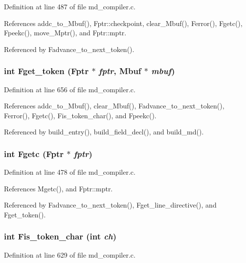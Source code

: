 Definition at line 487 of file md\_\-compiler.c.

References addc\_\-to\_\-Mbuf(), Fptr::checkpoint, clear\_\-Mbuf(), Ferror(), Fgetc(), Fpeekc(), move\_\-Mptr(), and Fptr::mptr.

Referenced by Fadvance\_\-to\_\-next\_\-token().
\subsubsection{\setlength{\rightskip}{0pt plus 5cm}int Fget\_\-token (\bf{Fptr} $\ast$ {\em fptr}, \bf{Mbuf} $\ast$ {\em mbuf})}\label{md__compiler_8c_eb1a56e9e7d7b8a58203813ef35c7452}




Definition at line 656 of file md\_\-compiler.c.

References addc\_\-to\_\-Mbuf(), clear\_\-Mbuf(), Fadvance\_\-to\_\-next\_\-token(), Ferror(), Fgetc(), Fis\_\-token\_\-char(), and Fpeekc().

Referenced by build\_\-entry(), build\_\-field\_\-decl(), and build\_\-md().
\subsubsection{\setlength{\rightskip}{0pt plus 5cm}int Fgetc (\bf{Fptr} $\ast$ {\em fptr})}\label{md__compiler_8c_50725b05de9292d7eb2eaa36a6d6fdcb}




Definition at line 478 of file md\_\-compiler.c.

References Mgetc(), and Fptr::mptr.

Referenced by Fadvance\_\-to\_\-next\_\-token(), Fget\_\-line\_\-directive(), and Fget\_\-token().
\subsubsection{\setlength{\rightskip}{0pt plus 5cm}int Fis\_\-token\_\-char (int {\em ch})}\label{md__compiler_8c_c297e377519f6ba4e2fd71db9b5b4fbf}




Definition at line 629 of file md\_\-compiler.c.

